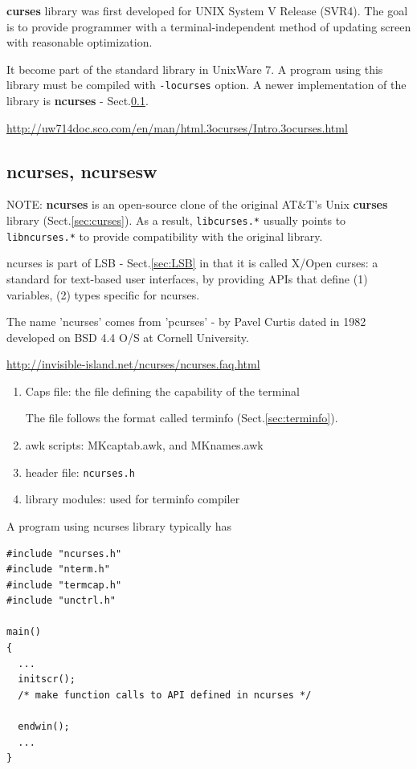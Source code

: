 {\bf curses} library was first developed for UNIX System V Release (SVR4). The
goal is to provide programmer with a terminal-independent method of updating
screen with reasonable optimization. 

It become part of the standard library in UnixWare 7. A program using this
library must be compiled with \verb!-locurses! option. A newer implementation of
the library is {\bf ncurses} - Sect.\ref{sec:ncurses}.

\url{http://uw714doc.sco.com/en/man/html.3ocurses/Intro.3ocurses.html}


\subsection{ncurses, ncursesw}
\label{sec:ncurses}

NOTE: {\bf ncurses} is an open-source clone of the original AT\&T's Unix {\bf
curses} library (Sect.\ref{sec:curses}). As a result, \verb!libcurses.*! usually
points to \verb!libncurses.*! to provide compatibility with the original
library.

ncurses is part of LSB - Sect.\ref{sec:LSB} in that it is called  X/Open curses:
a standard for text-based user interfaces, by providing APIs that define (1)
variables, (2) types specific for ncurses.

The name 'ncurses' comes from 'pcurses' - by Pavel Curtis dated in 1982
developed on BSD 4.4 O/S at Cornell University.


\url{http://invisible-island.net/ncurses/ncurses.faq.html}

\begin{enumerate}
  \item Caps file: the file defining the capability of the terminal
  
  The file follows the format called  terminfo  (Sect.\ref{sec:terminfo}).
  
  \item awk scripts: MKcaptab.awk, and MKnames.awk
  \item header file: \verb!ncurses.h!
  \item library modules: used for terminfo compiler
\end{enumerate}


A program using ncurses library typically has
\begin{verbatim}
#include "ncurses.h"
#include "nterm.h"
#include "termcap.h"
#include "unctrl.h"

main()
{
  ...
  initscr(); 
  /* make function calls to API defined in ncurses */
  
  endwin();
  ...
}
\end{verbatim}

